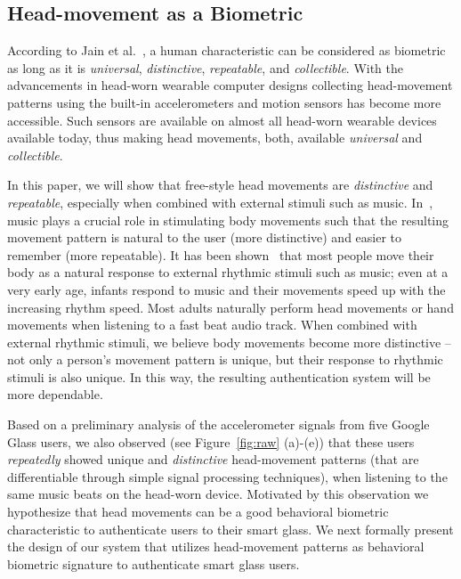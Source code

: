 \subsection{Head-movement as a Biometric}
\label{subsec:headmovements}


According to Jain et al.~\cite{jain2004introduction}, a human characteristic can be
considered as biometric as long as it is \emph{universal}, \emph{distinctive},
\emph{repeatable}, and \emph{collectible}. With the advancements in head-worn
wearable computer designs collecting head-movement
patterns using the built-in accelerometers and motion sensors has become more 
accessible. Such sensors are
available on almost all head-worn wearable devices available today, thus
making head movements, both, available {\em universal} and \emph{collectible}. 

In this paper, we will show that free-style head movements are \emph{distinctive} and \emph{repeatable}, especially when combined with external stimuli such as music. In~\systemname, music plays a crucial role in stimulating body movements such that the resulting movement pattern is natural to the user (more distinctive) and easier to remember (more repeatable). It has been shown~\cite{zentner2010rhythmic} that most people move
their body as a natural response to external rhythmic stimuli such as music;
even at a very early age, infants respond to music and their movements speed
up with the increasing rhythm speed. Most adults naturally perform head 
movements or hand movements when listening to a fast beat audio track.  When 
combined with external rhythmic stimuli, we believe body movements become more 
distinctive -- not only a person's movement pattern is unique, but their 
response to rhythmic stimuli is also unique. In this way, the resulting 
authentication system will be more dependable.

Based on a
preliminary analysis of the accelerometer signals from five Google Glass
users, we also observed (see Figure~\ref{fig:raw} (a)-(e)) 
that these users
{\em repeatedly} showed unique and {\em distinctive} head-movement patterns 
(that are differentiable through simple signal processing techniques),
when listening to the same music beats on the head-worn device.
Motivated by this observation we hypothesize that head movements
can be a good behavioral biometric characteristic to authenticate
users to their smart glass.
We next formally present the design of our system that
utilizes head-movement patterns as behavioral biometric signature
to authenticate smart glass users.

